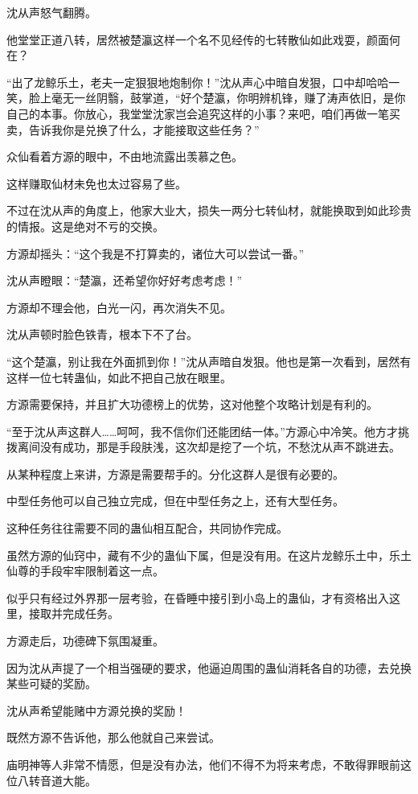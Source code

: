 \begin{this_body}
沈从声怒气翻腾。

他堂堂正道八转，居然被楚瀛这样一个名不见经传的七转散仙如此戏耍，颜面何在？

“出了龙鲸乐土，老夫一定狠狠地炮制你！”沈从声心中暗自发狠，口中却哈哈一笑，脸上毫无一丝阴翳，鼓掌道，“好个楚瀛，你明辨机锋，赚了涛声依旧，是你自己的本事。你放心，我堂堂沈家岂会追究这样的小事？来吧，咱们再做一笔买卖，告诉我你是兑换了什么，才能接取这些任务？”

众仙看着方源的眼中，不由地流露出羡慕之色。

这样赚取仙材未免也太过容易了些。

不过在沈从声的角度上，他家大业大，损失一两分七转仙材，就能换取到如此珍贵的情报。这是绝对不亏的交换。

方源却摇头：“这个我是不打算卖的，诸位大可以尝试一番。”

沈从声瞪眼：“楚瀛，还希望你好好考虑考虑！”

方源却不理会他，白光一闪，再次消失不见。

沈从声顿时脸色铁青，根本下不了台。

“这个楚瀛，别让我在外面抓到你！”沈从声暗自发狠。他也是第一次看到，居然有这样一位七转蛊仙，如此不把自己放在眼里。

方源需要保持，并且扩大功德榜上的优势，这对他整个攻略计划是有利的。

“至于沈从声这群人……呵呵，我不信你们还能团结一体。”方源心中冷笑。他方才挑拨离间没有成功，那是手段肤浅，这次却是挖了一个坑，不愁沈从声不跳进去。

从某种程度上来讲，方源是需要帮手的。分化这群人是很有必要的。

中型任务他可以自己独立完成，但在中型任务之上，还有大型任务。

这种任务往往需要不同的蛊仙相互配合，共同协作完成。

虽然方源的仙窍中，藏有不少的蛊仙下属，但是没有用。在这片龙鲸乐土中，乐土仙尊的手段牢牢限制着这一点。

似乎只有经过外界那一层考验，在昏睡中接引到小岛上的蛊仙，才有资格出入这里，接取并完成任务。

方源走后，功德碑下氛围凝重。

因为沈从声提了一个相当强硬的要求，他逼迫周围的蛊仙消耗各自的功德，去兑换某些可疑的奖励。

沈从声希望能赌中方源兑换的奖励！

既然方源不告诉他，那么他就自己来尝试。

庙明神等人非常不情愿，但是没有办法，他们不得不为将来考虑，不敢得罪眼前这位八转音道大能。

\end{this_body}


